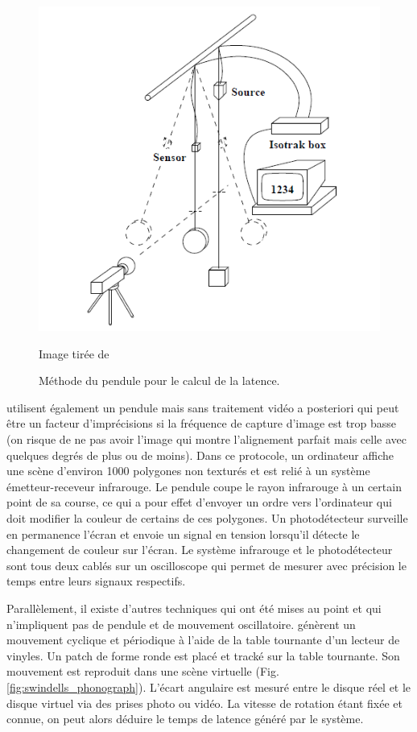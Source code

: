 	\begin{figure}
		\centering
		\includegraphics[scale=.6]{Figures/LiangPendulum}
		\caption{Méthode du pendule pour le calcul de la latence.}{Image tirée de \citep{liang_temporal-spatial_1991}}
		\label{fig:liang_pendulum}
	\end{figure}
	
	\par \citep{jacoby_improved_1996} utilisent également un pendule mais sans traitement vidéo a posteriori qui peut être un facteur d'imprécisions si la fréquence de capture d'image est trop basse (on risque de ne pas avoir l'image qui montre l'alignement parfait mais celle avec quelques degrés de plus ou de moins). Dans ce protocole, un ordinateur affiche une scène d'environ 1000 polygones non texturés et est relié à un système émetteur-receveur infrarouge. Le pendule coupe le rayon infrarouge à un certain point de sa course, ce qui a pour effet d'envoyer un ordre vers l'ordinateur qui doit modifier la couleur de certains de ces polygones. Un photodétecteur surveille en permanence l'écran et envoie un signal en tension lorsqu'il détecte le changement de couleur sur l'écran. Le système infrarouge et le photodétecteur sont tous deux cablés sur un oscilloscope qui permet de mesurer avec précision le temps entre leurs signaux respectifs.
	
	\par Parallèlement, il existe d'autres techniques qui ont été mises au point et qui n'impliquent pas de pendule et de mouvement oscillatoire. \citep{swindells_system_2000} génèrent un mouvement cyclique et périodique à l'aide de la table tournante d'un lecteur de vinyles. Un patch de forme ronde est placé et tracké sur la table tournante. Son mouvement est reproduit dans une scène virtuelle (Fig. \ref{fig:swindells_phonograph}). L'écart angulaire est mesuré entre le disque réel et le disque virtuel via des prises photo ou vidéo. La vitesse de rotation étant fixée et connue, on peut alors déduire le temps de latence généré par le système.
	
